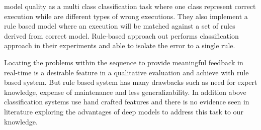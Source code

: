  model quality as a multi class classification task where one class represent correct execution while are different types of wrong executions. They also implement a rule based model where an execution will be matched against a set of rules derived from correct model. Rule-based approach out performs classification approach in their experiments and able to isolate the error to a single rule. 

Locating the problems within the sequence to provide meaningful feedback in real-time is a desirable feature in a qualitative evaluation and  achieve with rule based system. But rule based system has many drawbacks such as need for expert knowledge, expense of maintenance and less generalizability. In addition above classification systems use hand crafted features and there is no evidence seen in literature exploring the advantages of deep models to address this task to our knowledge. 
